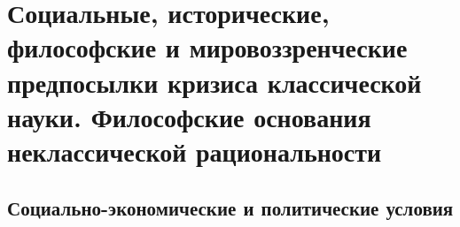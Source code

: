 \section[Предпосылки кризиса классической науки. Философские основания неклассической рациональности]{Социальные, исторические, философские и мировоззренческие предпосылки кризиса классической науки. Философские основания неклассической рациональности}

\subsection{Социально-экономические и политические условия}

